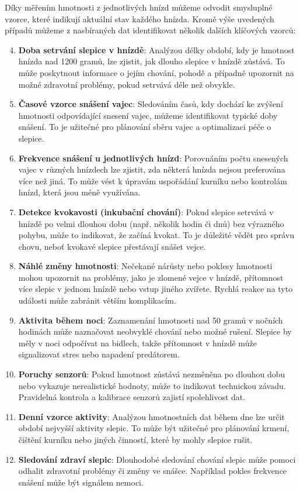 Díky měřením hmotnosti z jednotlivých hnízd můžeme odvodit smysluplné vzorce, které indikují aktuální stav každého hnízda. Kromě výše uvedených případů můžeme z nasbíraných dat identifikovat několik dalších klíčových vzorců:

\begin{enumerate}
    \setcounter{enumi}{3}
    \item \textbf{Doba setrvání slepice v hnízdě}: Analýzou délky období, kdy je hmotnost hnízda nad 1200 gramů, lze zjistit, jak dlouho slepice v hnízdě zůstává. To může poskytnout informace o jejím chování, pohodě a případně upozornit na možné zdravotní problémy, pokud setrvává déle než obvykle.
    \item \textbf{Časové vzorce snášení vajec}: Sledováním časů, kdy dochází ke zvýšení hmotnosti odpovídající snesení vajec, můžeme identifikovat typické doby snášení. To je užitečné pro plánování sběru vajec a optimalizaci péče o slepice.
    \item \textbf{Frekvence snášení u jednotlivých hnízd}: Porovnáním počtu snesených vajec v různých hnízdech lze zjistit, zda některá hnízda nejsou preferována více než jiná. To může vést k úpravám uspořádání kurníku nebo kontrolám hnízd, která jsou méně využívána.
    \item \textbf{Detekce kvokavosti (inkubační chování)}: Pokud slepice setrvává v hnízdě po velmi dlouhou dobu (např. několik hodin či dnů) bez výrazného pohybu, může to indikovat, že začíná kvokat. To je důležité vědět pro správu chovu, neboť kvokavé slepice přestávají snášet vejce.
    \item \textbf{Náhlé změny hmotnosti}: Nečekané nárůsty nebo poklesy hmotnosti mohou upozornit na problémy, jako je zlomené vejce v hnízdě, přítomnost více slepic v jednom hnízdě nebo vstup jiného zvířete. Rychlá reakce na tyto události může zabránit větším komplikacím.
    \item \textbf{Aktivita během noci}: Zaznamenání hmotnosti nad 50 gramů v nočních hodinách může naznačovat neobvyklé chování nebo možné rušení. Slepice by měly v noci odpočívat na bidlech, takže přítomnost v hnízdě může signalizovat stres nebo napadení predátorem.
    \item \textbf{Poruchy senzorů}: Pokud hmotnost zůstává nezměněna po dlouhou dobu nebo vykazuje nerealistické hodnoty, může to indikovat technickou závadu. Pravidelná kontrola a kalibrace senzorů zajistí spolehlivost dat.
    \item \textbf{Denní vzorce aktivity}: Analýzou hmotnostních dat během dne lze určit období nejvyšší aktivity slepic. To může být užitečné pro plánování krmení, čištění kurníku nebo jiných činností, které by mohly slepice rušit.
    \item \textbf{Sledování zdraví slepic}: Dlouhodobé sledování chování slepic může pomoci odhalit zdravotní problémy či změny ve snášce. Například pokles frekvence snášení může být signálem nemoci.
\end{enumerate}

